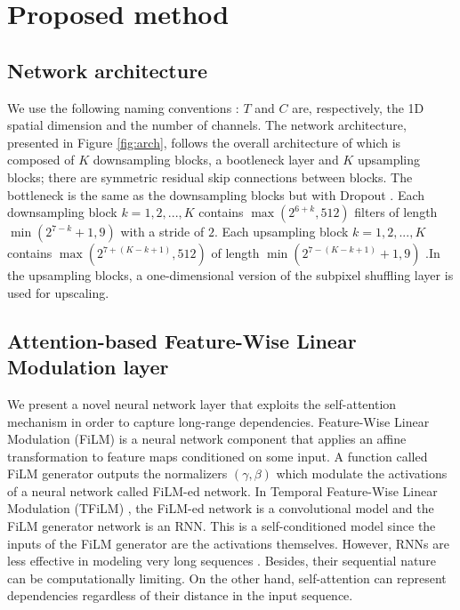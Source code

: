 \documentclass{article}
\begin{document}
\section{Proposed method} 
\label{sec:afilm}

\subsection{Network architecture} 
\label{subsec:arch}
We use the following naming conventions : $T$ and $C$ are, respectively, the 1D spatial dimension and the number of channels. The network architecture, presented in Figure \ref{fig:arch}, follows the overall architecture of \cite{kuleshov2017audio, birnbaum2019temporal} which is composed of $K$ downsampling blocks, a bootleneck layer and $K$ upsampling blocks; there are symmetric residual skip connections \cite{he2016deep} between blocks. The bottleneck is the same as the downsampling blocks but with Dropout \cite{srivastava2014dropout}. Each downsampling block $k=1,2,...,K$ contains $\max(2^{6+k},512)$ filters of length $\min(2^{7-k}+1,9)$ with a stride of $2$. Each upsampling block $k=1,2,...,K$ contains $\max(2^{7+(K-k+1)},512)$ of length $\min(2^{7-(K-k+1)}+1,9)$ .In the upsampling blocks, a one-dimensional version of the subpixel shuffling layer \cite{shi2016real} is used for upscaling.

\subsection{Attention-based Feature-Wise Linear Modulation layer} 
\label{subsec:afilm}
We present a novel neural network layer that exploits the self-attention mechanism in order to capture long-range dependencies. Feature-Wise Linear Modulation (FiLM) \cite{perez2017film} is a neural network component that applies an affine transformation to feature maps conditioned on some input. A function called FiLM generator outputs the normalizers $(\gamma,\beta)$ which modulate the activations of a neural network called  FiLM-ed network. In Temporal Feature-Wise Linear Modulation (TFiLM) \cite{birnbaum2019temporal}, the FiLM-ed network is a convolutional model and the FiLM generator network is an RNN. This is a self-conditioned model since the inputs of the FiLM generator are the activations themselves. However, RNNs are less effective in modeling very long sequences \cite{bengio1994learning}. Besides, their sequential nature can be computationally limiting. On the other hand, self-attention can represent dependencies regardless of their distance in the input sequence.
\end{document}
